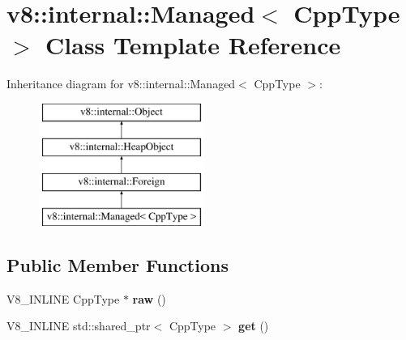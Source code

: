 \hypertarget{classv8_1_1internal_1_1Managed}{}\section{v8\+:\+:internal\+:\+:Managed$<$ Cpp\+Type $>$ Class Template Reference}
\label{classv8_1_1internal_1_1Managed}
Inheritance diagram for v8\+:\+:internal\+:\+:Managed$<$ Cpp\+Type $>$\+:\begin{figure}[H]
\begin{center}
\leavevmode
\includegraphics[height=4.000000cm]{classv8_1_1internal_1_1Managed}
\end{center}
\end{figure}
\subsection*{Public Member Functions}
\begin{DoxyCompactItemize}
\item 
\mbox{\label{classv8_1_1internal_1_1Managed_a112bc0eebf0c2cc10234f37b600ae29c}} 
V8\+\_\+\+I\+N\+L\+I\+NE Cpp\+Type $\ast$ {\bfseries raw} ()
\item 
\mbox{\label{classv8_1_1internal_1_1Managed_a475353feb9b39f8a32ba60527dc50555}} 
V8\+\_\+\+I\+N\+L\+I\+NE std\+::shared\+\_\+ptr$<$ Cpp\+Type $>$ {\bfseries get} ()
\end{DoxyCompactItemize}
